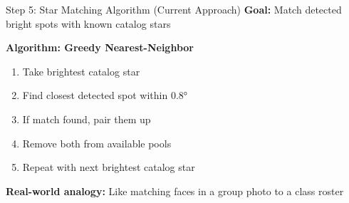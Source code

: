 \documentclass[aspectratio=169]{beamer}
\begin{document}
\begin{frame}{Step 5: Star Matching Algorithm (Current Approach)}
\textbf{Goal:} Match detected bright spots with known catalog stars

\textbf{Algorithm: Greedy Nearest-Neighbor}
\begin{enumerate}
\item Take brightest catalog star
\item Find closest detected spot within 0.8°
\item If match found, pair them up
\item Remove both from available pools
\item Repeat with next brightest catalog star
\end{enumerate}

\begin{center}
\end{center}

\textbf{Real-world analogy:} \textcolor{starblue}{Like matching faces in a group photo to a class roster}
\end{frame}
\end{document}
